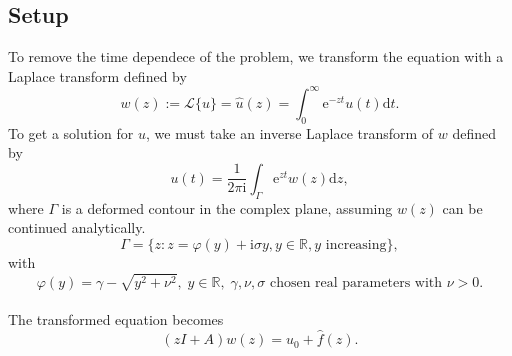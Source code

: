 \documentclass[letterpaper, 12pt]{article}
\def\e{\text{e}}
\def\L{\mathcal{L}}
\def\i{\text{i}}
\def\d{\text{d}}
\def\R{{\mathbb{R}}}
\begin{document}
		\subsection*{Setup}
		To remove the time dependece of the problem, we transform the equation with a Laplace transform defined by
		$$w(z):=\L\{u\}=\hat{u}(z)=\int_0^\infty\e^{-zt}u(t)\d t.$$
		To get a solution for $u$, we must take an inverse Laplace transform of $w$ defined by
		\begin{equation}\label{inv}
			u(t)=\frac{1}{2\pi\i}\int_\Gamma\e^{zt}w(z)\d z,	
		\end{equation}	
		where $\Gamma$ is a deformed contour in the complex plane, assuming $w(z)$ can be continued analytically. 
		$$\Gamma=\{z:z=\varphi(y)+\i\sigma y, y\in\R, y\text{ increasing}\},$$
		with
		$$\varphi(y)=\gamma-\sqrt{y^2+\nu^2},\;y\in\R,\;\gamma,\nu,\sigma\text{ chosen real parameters with }\nu>0.$$\\
		The transformed equation becomes
		\begin{equation}\label{ode}
			(zI+A)w(z)=u_0+\hat{f}(z).
		\end{equation}
		
\end{document}
